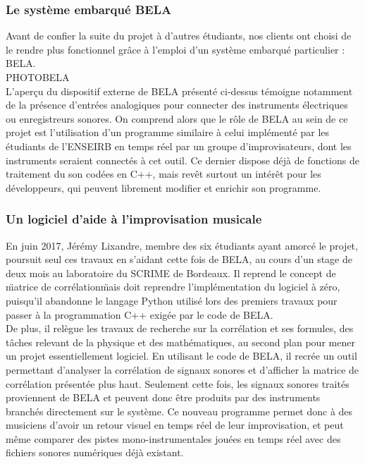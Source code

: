 \subsubsection{Le système embarqué BELA}
Avant de confier la suite du projet à d'autres étudiants, nos clients
ont choisi de le rendre plus fonctionnel grâce à l'emploi d'un système
embarqué particulier : BELA. \\
PHOTOBELA \\
L'aperçu du dispositif externe de BELA présenté ci-dessus témoigne
notamment de la présence d'entrées analogiques pour connecter des
instruments électriques ou enregistreurs sonores. On comprend alors
que le rôle de BELA au sein de ce projet est l'utilisation d'un
programme similaire à celui implémenté par les étudiants de l'ENSEIRB
en temps réel par un groupe d'improvisateurs, dont les instruments
seraient connectés à cet outil. Ce dernier dispose déjà de fonctions
de traitement du son codées en C++, mais revêt surtout un intérêt pour
les développeurs, qui peuvent librement modifier et enrichir son
programme.

\subsubsection{Un logiciel d'aide à l'improvisation musicale}
En juin 2017, Jérémy Lixandre, membre des six étudiants ayant amorcé
le projet, poursuit seul ces travaux en s'aidant cette fois de BELA,
au cours d'un stage de deux mois au laboratoire du SCRIME de
Bordeaux. Il reprend le concept de \"matrice de corrélation\" mais
doit reprendre l'implémentation du logiciel à zéro, puisqu'il
abandonne le langage Python utilisé lors des premiers travaux pour
passer à la programmation C++ exigée par le code de BELA. \\
De plus, il relègue les travaux de recherche sur la corrélation et ses
formules, des tâches relevant de la physique et des mathématiques, au
second plan pour mener un projet essentiellement logiciel. En
utilisant le code de BELA, il recrée un outil permettant d'analyser la
corrélation de signaux sonores et d'afficher la matrice de corrélation
présentée plus haut. Seulement cette fois, les signaux sonores traités
proviennent de BELA et peuvent donc être produits par des instruments
branchés directement sur le système. Ce nouveau programme permet donc
à des musiciens d'avoir un retour visuel en temps réel de leur
improvisation, et peut même comparer des pistes mono-instrumentales
jouées en temps réel avec des fichiers sonores numériques déjà
existant.

